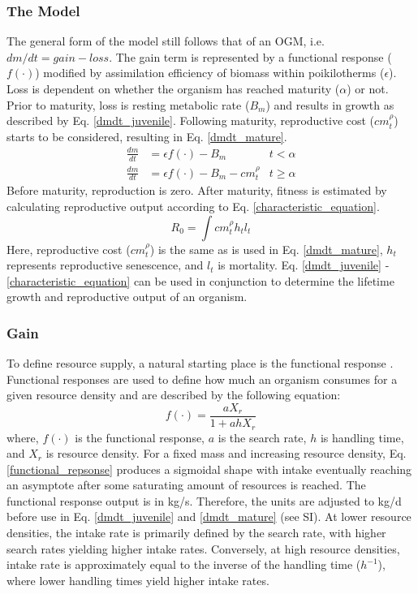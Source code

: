 \documentclass[a4paper, 11pt, hidelinks]{article} %
\begin{document}
	\subsubsection{The Model}
	The general form of the model still follows that of an OGM, i.e. $dm/dt = gain - loss$.  The gain term is represented by a functional response ($ f(\cdot)$) modified by assimilation efficiency of biomass within poikilotherms ($ \epsilon $).  Loss is dependent on whether the organism has reached maturity ($ \alpha $) or not.  Prior to maturity, loss is resting metabolic rate ($ B_m $) and results in growth as described by Eq. \ref{dmdt_juvenile}.  Following maturity, reproductive cost ($ cm_t^\rho $) starts to be considered, resulting in Eq. \ref{dmdt_mature}.
	\begin{align}
		\label{dmdt_juvenile}
		\frac{dm}{dt} &= \epsilon f(\cdot) - B_m & t < \alpha \\
		\label{dmdt_mature}
		\frac{dm}{dt} &= \epsilon f(\cdot) - B_m - cm_t^\rho & t \geq \alpha
	\end{align}
	Before maturity, reproduction is zero.
	After maturity, fitness is estimated by calculating reproductive output according to Eq. \ref{characteristic_equation}.
	\begin{equation}
		\label{characteristic_equation}
		R_0 = \int c m_t^\rho h_t l_t 
	\end{equation}
	Here, reproductive cost ($ cm_t^\rho $) is the same as is used in Eq. \ref{dmdt_mature},  $h_t$ represents reproductive senescence, and $ l_t $ is mortality. Eq. \ref{dmdt_juvenile} - \ref{characteristic_equation} can be used in conjunction to determine the lifetime growth and reproductive output of an organism.
	
	
	\subsubsection{Gain}
	To define resource supply, a natural starting place is the functional response \parencite{Holling1959}.  Functional responses  are used to define how much an organism consumes for a given resource density and are described by the following equation:	
	\begin{equation}
		\label{functional_repsonse}
		f(\cdot) = \frac{a X_r}{1 + a h X_r}
	\end{equation}
	where, $ f(\cdot) $ is the functional response, $ a $ is the search rate, $ h $ is handling time, and $ X_r $ is resource density.  
	For a fixed mass and increasing resource density, Eq. \ref{functional_repsonse} produces a sigmoidal shape with intake eventually reaching an asymptote after some saturating amount of resources is reached.  The functional response output is in kg/s.  Therefore, the units are adjusted to kg/d before use in Eq. \ref{dmdt_juvenile} and \ref{dmdt_mature} (see SI).  At lower resource densities, the intake rate is primarily defined by the search rate, with higher search rates yielding higher intake rates.  Conversely, at high resource densities, intake rate is approximately equal to the inverse of the handling time ($ h^{-1} $), where lower handling times yield higher intake rates.  
	
\end{document}
